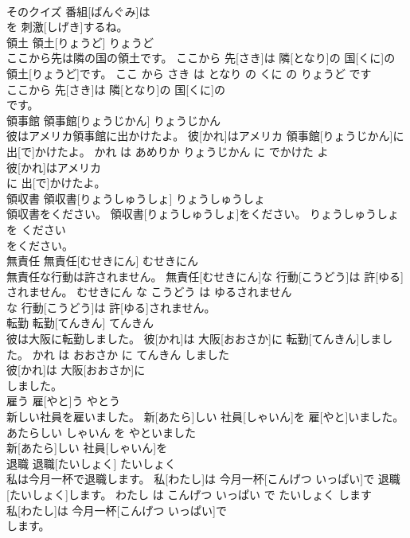 \documentclass[8pt]{extreport}
\begin{document}
\begin{CJK}{UTF8}{min}
\\	そのクイズ 番組[ばんぐみ]は
\\	を 刺激[しげき]するね。			
\\	領土	領土[りょうど]	りょうど	
\\	ここから先は隣の国の領土です。	ここから 先[さき]は 隣[となり]の 国[くに]の 領土[りょうど]です。	ここ から さき は となり の くに の りょうど です	
\\	ここから 先[さき]は 隣[となり]の 国[くに]の
\\	です。			
\\	領事館	領事館[りょうじかん]	りょうじかん	
\\	彼はアメリカ領事館に出かけたよ。	彼[かれ]はアメリカ 領事館[りょうじかん]に 出[で]かけたよ。	かれ は あめりか りょうじかん に でかけた よ	
\\	彼[かれ]はアメリカ
\\	に 出[で]かけたよ。			
\\	領収書	領収書[りょうしゅうしょ]	りょうしゅうしょ	
\\	領収書をください。	領収書[りょうしゅうしょ]をください。	りょうしゅうしょ を ください	
\\	をください。			
\\	無責任	無責任[むせきにん]	むせきにん	
\\	無責任な行動は許されません。	無責任[むせきにん]な 行動[こうどう]は 許[ゆる]されません。	むせきにん な こうどう は ゆるされません	
\\	な 行動[こうどう]は 許[ゆる]されません。			
\\	転勤	転勤[てんきん]	てんきん	
\\	彼は大阪に転勤しました。	彼[かれ]は 大阪[おおさか]に 転勤[てんきん]しました。	かれ は おおさか に てんきん しました	
\\	彼[かれ]は 大阪[おおさか]に
\\	しました。			
\\	雇う	雇[やと]う	やとう	
\\	新しい社員を雇いました。	新[あたら]しい 社員[しゃいん]を 雇[やと]いました。	あたらしい しゃいん を やといました	
\\	新[あたら]しい 社員[しゃいん]を
\\	退職	退職[たいしょく]	たいしょく	
\\	私は今月一杯で退職します。	私[わたし]は 今月一杯[こんげつ いっぱい]で 退職[たいしょく]します。	わたし は こんげつ いっぱい で たいしょく します	
\\	私[わたし]は 今月一杯[こんげつ いっぱい]で
\\	します。			

\end{CJK}
\end{document}

